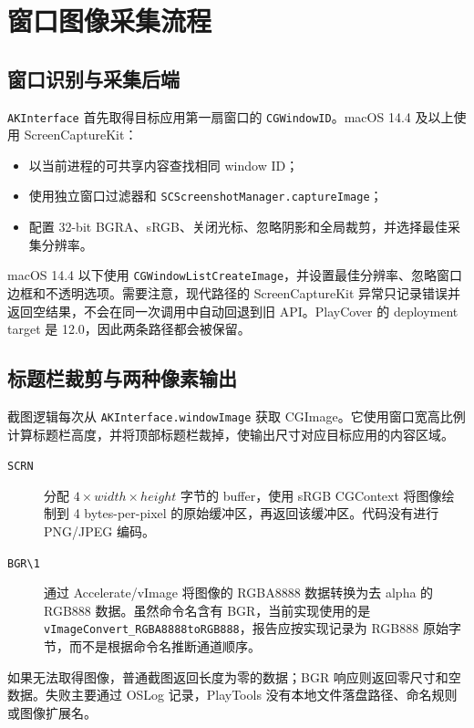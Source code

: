 \documentclass[UTF8,a4paper,11pt]{ctexart}
\begin{document}
\section{窗口图像采集流程}

\subsection{窗口识别与采集后端}

\texttt{AKInterface} 首先取得目标应用第一扇窗口的 \texttt{CGWindowID}。macOS 14.4 及以上使用 ScreenCaptureKit：

\begin{itemize}
  \item 以当前进程的可共享内容查找相同 window ID；
  \item 使用独立窗口过滤器和 \texttt{SCScreenshotManager.captureImage}；
  \item 配置 32-bit BGRA、sRGB、关闭光标、忽略阴影和全局裁剪，并选择最佳采集分辨率。
\end{itemize}

macOS 14.4 以下使用 \texttt{CGWindowListCreateImage}，并设置最佳分辨率、忽略窗口边框和不透明选项。需要注意，现代路径的 ScreenCaptureKit 异常只记录错误并返回空结果，不会在同一次调用中自动回退到旧 API。PlayCover 的 deployment target 是 12.0，因此两条路径都会被保留。

\subsection{标题栏裁剪与两种像素输出}

截图逻辑每次从 \texttt{AKInterface.windowImage} 获取 CGImage。它使用窗口宽高比例计算标题栏高度，并将顶部标题栏裁掉，使输出尺寸对应目标应用的内容区域。

\begin{description}
  \item[\texttt{SCRN}] 分配 \(4 \times width \times height\) 字节的 buffer，使用 sRGB CGContext 将图像绘制到 4 bytes-per-pixel 的原始缓冲区，再返回该缓冲区。代码没有进行 PNG/JPEG 编码。
  \item[\texttt{BGR\textbackslash{}1}] 通过 Accelerate/vImage 将图像的 RGBA8888 数据转换为去 alpha 的 RGB888 数据。虽然命令名含有 BGR，当前实现使用的是 \texttt{vImageConvert\_RGBA8888toRGB888}，报告应按实现记录为 RGB888 原始字节，而不是根据命令名推断通道顺序。
\end{description}

如果无法取得图像，普通截图返回长度为零的数据；BGR 响应则返回零尺寸和空数据。失败主要通过 OSLog 记录，PlayTools 没有本地文件落盘路径、命名规则或图像扩展名。
\end{document}
